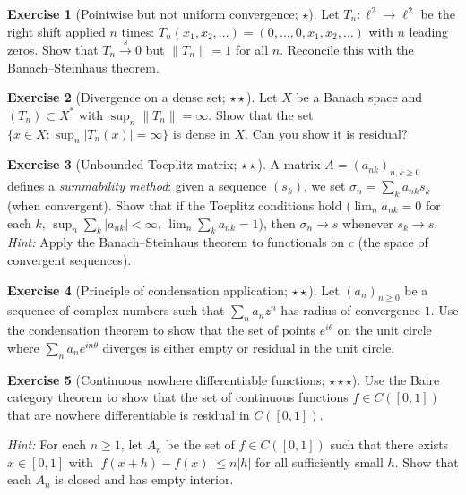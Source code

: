 \documentclass[a4paper,12pt]{book}
\newcommand{\norm}[1]{\left\| #1 \right\|}
\newcommand{\abs}[1]{\left| #1 \right|}
\theoremstyle{definition}
\newtheorem{exercise}{Exercise}[chapter]
\theoremstyle{plain}
\theoremstyle{remark}
\begin{document}
\begin{exercise}[Pointwise but not uniform convergence; $\star$]\label{ex:ptwise-not-uniform}
Let $T_n \colon \ell^2 \to \ell^2$ be the right shift applied $n$ times:
$T_n(x_1, x_2, \ldots) = (0, \ldots, 0, x_1, x_2, \ldots)$ with $n$ leading zeros.
Show that $T_n \xrightarrow{s} 0$ but $\norm{T_n} = 1$ for all $n$. Reconcile this
with the Banach--Steinhaus theorem.
\end{exercise}

\begin{exercise}[Divergence on a dense set; $\star\star$]\label{ex:divergence-dense}
Let $X$ be a Banach space and $(T_n) \subset X^*$ with $\sup_n \norm{T_n} = \infty$.
Show that the set $\{x \in X : \sup_n \abs{T_n(x)} = \infty\}$ is dense in $X$.
Can you show it is residual?
\end{exercise}

\begin{exercise}[Unbounded Toeplitz matrix; $\star\star$]\label{ex:toeplitz}
A matrix $A = (a_{nk})_{n,k \geq 0}$ defines a \emph{summability method}: given
a sequence $(s_k)$, we set $\sigma_n = \sum_k a_{nk} s_k$ (when convergent). Show
that if the Toeplitz conditions hold ($\lim_n a_{nk} = 0$ for each $k$,
$\sup_n \sum_k \abs{a_{nk}} < \infty$, $\lim_n \sum_k a_{nk} = 1$), then
$\sigma_n \to s$ whenever $s_k \to s$. \textit{Hint:} Apply the Banach--Steinhaus
theorem to functionals on $c$ (the space of convergent sequences).
\end{exercise}

\begin{exercise}[Principle of condensation application; $\star\star$]\label{ex:condensation-power-series}
Let $(a_n)_{n \geq 0}$ be a sequence of complex numbers such that $\sum_n a_n z^n$
has radius of convergence $1$. Use the condensation theorem to show that the set
of points $e^{i\theta}$ on the unit circle where $\sum_n a_n e^{in\theta}$ diverges
is either empty or residual in the unit circle.
\end{exercise}

\begin{exercise}[Continuous nowhere differentiable functions; $\star\star\star$]%
\label{ex:nowhere-diff}
Use the Baire category theorem to show that the set of continuous functions
$f \in C([0,1])$ that are nowhere differentiable is residual in $C([0,1])$.

\noindent\textit{Hint:} For each $n \geq 1$, let $A_n$ be the set of $f \in C([0,1])$
such that there exists $x \in [0,1]$ with
$\abs{f(x+h) - f(x)} \leq n\abs{h}$ for all sufficiently small $h$. Show that each
$A_n$ is closed and has empty interior.
\end{exercise}
\end{document}
